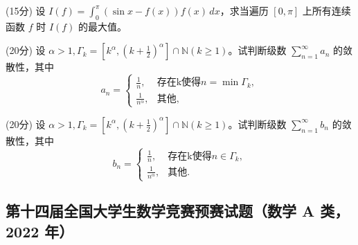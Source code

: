 \documentclass[loose]{ExBook}
\begin{document}
\begin{qitems}
    \begin{bbox}
        \qitem (15分) 设 \( I(f) = \int_{0}^{\pi} (\sin x - f(x))f(x) \, dx \)，求当遍历 \([0, \pi]\) 上所有连续函数 \( f \) 时 \( I(f) \) 的最大值。
    \end{bbox}

    \begin{bbox}
        \begin{minipage}{0.48\textwidth}
        \qitem (20分) 设 \( \alpha > 1, \Gamma_k = \left[ k^{\alpha}, \left( k + \frac{1}{2} \right)^{\alpha} \right] \cap \mathbb{N} (k \geq 1) \)。试判断级数 \(\sum_{n=1}^{\infty} a_n\) 的敛散性，其中
        \[
        a_n = 
        \begin{cases} 
        \frac{1}{n}, & \text{存在k使得} n = \min \Gamma_k, \\
        \frac{1}{n^{\alpha}}, & \text{其他},
        \end{cases}
        \]
        \end{minipage}
        \hfill
        \begin{minipage}{0.48\textwidth}
        \qitem (20分) 设 \( \alpha > 1, \Gamma_k = \left[ k^{\alpha}, \left( k + \frac{1}{2} \right)^{\alpha} \right] \cap \mathbb{N} (k \geq 1) \)。试判断级数 \(\sum_{n=1}^{\infty} b_n\) 的敛散性，其中
        \[
        b_n = 
        \begin{cases} 
        \frac{1}{n}, & \text{存在k使得} n \in \Gamma_k, \\
        \frac{1}{n^{\alpha}}, & \text{其他}.
        \end{cases}
        \]
        \end{minipage}
    \end{bbox}
\end{qitems}
\subsection{第十四届全国大学生数学竞赛预赛试题（数学 A 类， 2022 年）}
\end{document}
